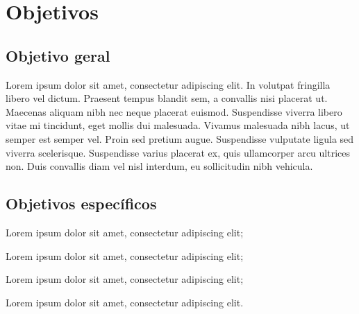 \section{Objetivos}

\subsection{Objetivo geral}

Lorem ipsum dolor sit amet, consectetur adipiscing elit. In volutpat fringilla libero vel dictum. Praesent tempus blandit sem, a convallis nisi placerat ut. Maecenas aliquam nibh nec neque placerat euismod. Suspendisse viverra libero vitae mi tincidunt, eget mollis dui malesuada. Vivamus malesuada nibh lacus, ut semper est semper vel. Proin sed pretium augue. Suspendisse vulputate ligula sed viverra scelerisque. Suspendisse varius placerat ex, quis ullamcorper arcu ultrices non. Duis convallis diam vel nisl interdum, eu sollicitudin nibh vehicula.

\subsection{Objetivos específicos}

\begin{alineas}
  \item Lorem ipsum dolor sit amet, consectetur adipiscing elit;
  \item Lorem ipsum dolor sit amet, consectetur adipiscing elit;
  \item Lorem ipsum dolor sit amet, consectetur adipiscing elit;
  \item Lorem ipsum dolor sit amet, consectetur adipiscing elit.
 \end{alineas}




